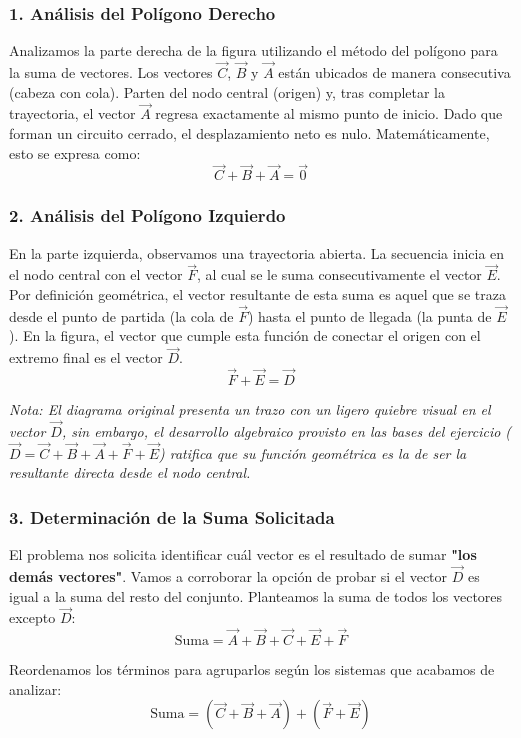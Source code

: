 \documentclass[12pt, a4paper]{article}
\begin{document}
\subsubsection*{1. Análisis del Polígono Derecho}
Analizamos la parte derecha de la figura utilizando el método del polígono para la suma de vectores. Los vectores $\vec{C}$, $\vec{B}$ y $\vec{A}$ están ubicados de manera consecutiva (cabeza con cola). Parten del nodo central (origen) y, tras completar la trayectoria, el vector $\vec{A}$ regresa exactamente al mismo punto de inicio. 
Dado que forman un circuito cerrado, el desplazamiento neto es nulo. Matemáticamente, esto se expresa como:
$$ \vec{C} + \vec{B} + \vec{A} = \vec{0} $$

\subsubsection*{2. Análisis del Polígono Izquierdo}
En la parte izquierda, observamos una trayectoria abierta. La secuencia inicia en el nodo central con el vector $\vec{F}$, al cual se le suma consecutivamente el vector $\vec{E}$. 
Por definición geométrica, el vector resultante de esta suma es aquel que se traza desde el punto de partida (la cola de $\vec{F}$) hasta el punto de llegada (la punta de $\vec{E}$). En la figura, el vector que cumple esta función de conectar el origen con el extremo final es el vector $\vec{D}$.
$$ \vec{F} + \vec{E} = \vec{D} $$

\textit{Nota: El diagrama original presenta un trazo con un ligero quiebre visual en el vector $\vec{D}$, sin embargo, el desarrollo algebraico provisto en las bases del ejercicio ($\vec{D} = \vec{C} + \vec{B} + \vec{A} + \vec{F} + \vec{E}$) ratifica que su función geométrica es la de ser la resultante directa desde el nodo central.}

\subsubsection*{3. Determinación de la Suma Solicitada}
El problema nos solicita identificar cuál vector es el resultado de sumar \textbf{"los demás vectores"}. Vamos a corroborar la opción de probar si el vector $\vec{D}$ es igual a la suma del resto del conjunto.
Planteamos la suma de todos los vectores excepto $\vec{D}$:
$$ \text{Suma} = \vec{A} + \vec{B} + \vec{C} + \vec{E} + \vec{F} $$

Reordenamos los términos para agruparlos según los sistemas que acabamos de analizar:
$$ \text{Suma} = (\vec{C} + \vec{B} + \vec{A}) + (\vec{F} + \vec{E}) $$
\end{document}
